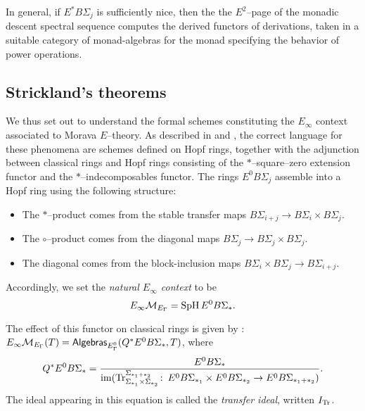 \begin{remark}
In general, if $E^* B\Sigma_j$ is sufficiently nice, then the the $E^2$--page of the monadic descent spectral sequence computes the derived functors of derivations, taken in a suitable category of monad-algebras for the monad specifying the behavior of power operations.
\end{remark}






\subsection*{Strickland's theorems}

We thus set out to understand the formal schemes constituting the $E_\infty$ context associated to Morava $E$--theory.  As described in  and , the correct language for these phenomena are schemes defined on Hopf rings, together with the adjunction between classical rings and Hopf rings consisting of the $\ast$--square--zero extension functor and the $\ast$--indecomposables functor.  The rings $E^0 B\Sigma_j$ assemble into a Hopf ring using the following structure:
\begin{itemize}
    \item The $\ast$--product comes from the stable transfer maps $B\Sigma_{i+j} \to B\Sigma_i \times B\Sigma_j$.
    \item The $\circ$--product comes from the diagonal maps $B\Sigma_j \to B\Sigma_j \times B\Sigma_j$.
    \item The diagonal comes from the block-inclusion maps $B\Sigma_i \times B\Sigma_j \to B\Sigma_{i+j}$.
\end{itemize}

\begin{definition}
Accordingly, we set the \textit{natural $E_\infty$ context} to be \[E_\infty\mathcal{M}_{E_\Gamma} = \operatorname{SpH} E^0 B\Sigma_*.\]
\end{definition}

The effect of this functor on classical rings is given by : $E_\infty\mathcal{M}_{E_\Gamma}(T) = \mathsf{Algebras}_{E_\Gamma^0}(Q^* E^0 B\Sigma_*, T)$, where \[Q^* E^0 B\Sigma_* = \frac{E^0 B\Sigma_*}{\operatorname{im}(\mathrm{Tr}_{\Sigma_{*_1} \times \Sigma_{*_2}}^{\Sigma_{*_1 + *_2}}\colon\thinspace E^0 B\Sigma_{*_1} \times E^0 B\Sigma_{*_2} \to E^0 B\Sigma_{*_1 + *_2})}.\]  The ideal appearing in this equation is called the \textit{transfer ideal}, written $I_{\mathrm{Tr}}$.

